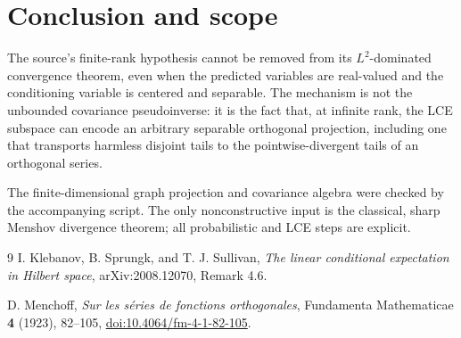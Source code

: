 \documentclass[11pt]{article}
\begin{document}
\section{Conclusion and scope}

The source's finite-rank hypothesis cannot be removed from its
\(L^2\)-dominated convergence theorem, even when the predicted variables are
real-valued and the conditioning variable is centered and separable. The
mechanism is not the unbounded covariance pseudoinverse: it is the fact that,
at infinite rank, the LCE subspace can encode an arbitrary separable
orthogonal projection, including one that transports harmless disjoint tails
to the pointwise-divergent tails of an orthogonal series.

The finite-dimensional graph projection and covariance algebra were checked
by the accompanying script. The only nonconstructive input is the classical,
sharp Menshov divergence theorem; all probabilistic and LCE steps are explicit.

\begin{thebibliography}{9}
I. Klebanov, B. Sprungk, and T. J. Sullivan,
\emph{The linear conditional expectation in Hilbert space},
arXiv:2008.12070, Remark 4.6.

D. Menchoff,
\emph{Sur les s\'eries de fonctions orthogonales},
Fundamenta Mathematicae \textbf{4} (1923), 82--105,
\href{https://doi.org/10.4064/fm-4-1-82-105}{doi:10.4064/fm-4-1-82-105}.
\end{thebibliography}
\end{document}
